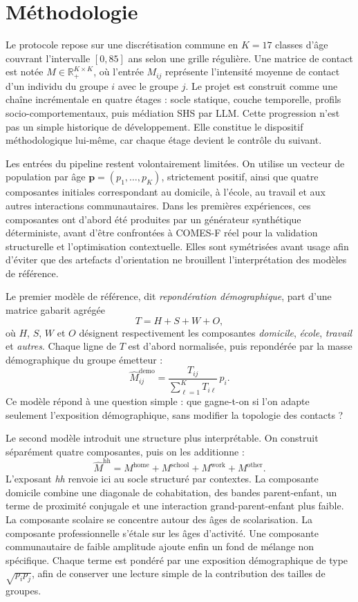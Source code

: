 \documentclass[ROIA,Unicode]{cedram}
\begin{document}
\section{Méthodologie}
Le protocole repose sur une discrétisation commune en $K=17$ classes d'âge couvrant l'intervalle $[0,85]$ ans selon une grille régulière. Une matrice de contact est notée $M \in \mathbb{R}_{+}^{K\times K}$, où l'entrée $M_{ij}$ représente l'intensité moyenne de contact d'un individu du groupe $i$ avec le groupe $j$. Le projet est construit comme une chaîne incrémentale en quatre étages : socle statique, couche temporelle, profils socio-comportementaux, puis médiation SHS par LLM. Cette progression n'est pas un simple historique de développement. Elle constitue le dispositif méthodologique lui-même, car chaque étage devient le contrôle du suivant.

Les entrées du pipeline restent volontairement limitées. On utilise un vecteur de population par âge $\mathbf{p}=(p_1,\dots,p_K)$, strictement positif, ainsi que quatre composantes initiales correspondant au domicile, à l'école, au travail et aux autres interactions communautaires. Dans les premières expériences, ces composantes ont d'abord été produites par un générateur synthétique déterministe, avant d'être confrontées à COMES-F réel pour la validation structurelle et l'optimisation contextuelle. Elles sont symétrisées avant usage afin d'éviter que des artefacts d'orientation ne brouillent l'interprétation des modèles de référence.

Le premier modèle de référence, dit \emph{repondération démographique}, part d'une matrice gabarit agrégée
\[
T = H + S + W + O,
\]
où $H$, $S$, $W$ et $O$ désignent respectivement les composantes \emph{domicile}, \emph{école}, \emph{travail} et \emph{autres}. Chaque ligne de $T$ est d'abord normalisée, puis repondérée par la masse démographique du groupe émetteur :
\[
\widehat{M}^{\mathrm{demo}}_{ij} = \frac{T_{ij}}{\sum_{\ell=1}^{K} T_{i\ell}}\, p_i.
\]
Ce modèle répond à une question simple : que gagne-t-on si l'on adapte seulement l'exposition démographique, sans modifier la topologie des contacts ?

Le second modèle introduit une structure plus interprétable. On construit séparément quatre composantes, puis on les additionne :
\[
\widehat{M}^{\mathrm{hh}} = M^{\mathrm{home}} + M^{\mathrm{school}} + M^{\mathrm{work}} + M^{\mathrm{other}}.
\]
L'exposant \emph{hh} renvoie ici au socle structuré par contextes. La composante domicile combine une diagonale de cohabitation, des bandes parent-enfant, un terme de proximité conjugale et une interaction grand-parent-enfant plus faible. La composante scolaire se concentre autour des âges de scolarisation. La composante professionnelle s'étale sur les âges d'activité. Une composante communautaire de faible amplitude ajoute enfin un fond de mélange non spécifique. Chaque terme est pondéré par une exposition démographique de type $\sqrt{p_i p_j}$, afin de conserver une lecture simple de la contribution des tailles de groupes.
\end{document}
